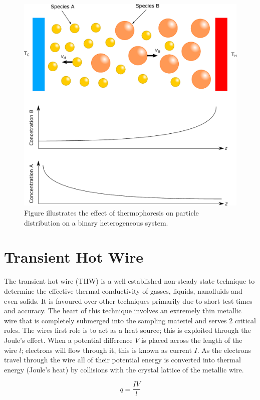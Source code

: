 \documentclass[12pt,MEng]{UoAThesis}
\begin{document}
\begin{figure}[htp]
  \centering
  \includegraphics[clip,width=1\linewidth]{figures/thermo}
  \caption{\label{fig:thermo} Figure illustrates the effect of thermophoresis on particle distribution on a binary heterogeneous system.}
\end{figure}

\chapter{Transient Hot Wire}
The transient hot wire (THW) is a well established non-steady state technique to determine the effective thermal conductivity of gasses, liquids, nanofluids and even solids. It is favoured over other techniques primarily due to short test times and accuracy. The heart of this technique involves an extremely thin metallic wire that is completely submerged into the sampling materiel and serves 2 critical roles. The wires first role is to act as a heat source; this is exploited through the Joule's effect. When a potential difference $ V $ is placed across the length of the wire $l$; electrons will flow through it, this is known as current $I$. As the electrons travel through the wire all of their potential energy is converted into thermal energy (Joule's heat) by collisions with the crystal lattice of the metallic wire. 

\begin{equation}\label{eq:heat1}
q = \frac{I V}{l}
\end{equation}
\end{document}

